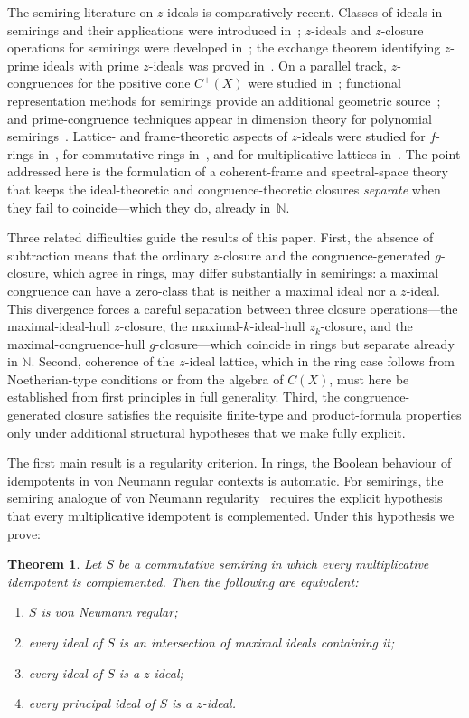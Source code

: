 \documentclass[11pt,leqno]{amsart}
\theoremstyle{plain}
\newtheorem{maintheorem}{Theorem}
\theoremstyle{definition}
\theoremstyle{remark}
\numberwithin{equation}{section}
\newcommand{\N}{\mathds N}
\begin{document}
The semiring literature on $z$-ideals is comparatively recent.
Classes of ideals in semirings and their applications were introduced
in~\cite{BiswasFilomat}; $z$-ideals and $z$-closure operations
for semirings were developed in~\cite{AG23}; the exchange theorem
identifying $z$-prime ideals with prime $z$-ideals was
proved in~\cite{AG25}.
On a parallel track, $z$-congruences for the positive cone $C^+(X)$
were studied in~\cite{BiswasPositivity};
functional representation methods for semirings provide an additional
geometric source~\cite{Chermnykh12};
and prime-congruence techniques appear in dimension theory for
polynomial semirings~\cite{Joo/Micheva/dimension}.
Lattice- and frame-theoretic aspects of $z$-ideals were studied
for $f$-rings in~\cite{DubeZ-ideals,DubeRadical},
for commutative rings in~\cite{Ighedo},
and for multiplicative lattices in~\cite{GoswamiDube}.
The point addressed here is the formulation of a coherent-frame
and spectral-space theory that keeps the ideal-theoretic and
congruence-theoretic closures \emph{separate} when they fail to coincide---which they do, already in~$\N$.

Three related difficulties guide the results of this paper.
First, the absence of subtraction means that the ordinary $z$-closure
and the congruence-generated $g$-closure, which agree in rings,
may differ substantially in semirings:
a maximal congruence can have a zero-class that is neither a maximal
ideal nor a $z$-ideal.
This divergence forces a careful separation between three closure
operations---the maximal-ideal-hull $z$-closure,
the maximal-$k$-ideal-hull $z_k$-closure,
and the maximal-congruence-hull $g$-closure---which coincide in
rings but separate already in $\N$.
Second, coherence of the $z$-ideal lattice, which in the ring case
follows from Noetherian-type conditions or from the algebra of
$C(X)$, must here be established from first principles in full
generality.
Third, the congruence-generated closure satisfies the requisite
finite-type and product-formula properties only under additional
structural hypotheses that we make fully explicit.

The first main result is a regularity criterion.
In rings, the Boolean behaviour of idempotents in von Neumann regular
contexts is automatic.
For semirings, the semiring analogue of von Neumann
regularity~\cite{Subramanian70/RegularSemirings} requires the explicit
hypothesis that every multiplicative idempotent is complemented.
Under this hypothesis we prove:

\begin{maintheorem}\label{main:regularity}
Let $S$ be a commutative semiring in which every multiplicative
idempotent is complemented.  Then the following are equivalent:
\begin{enumerate}[label=\upshape(\roman*)]
\item $S$ is von Neumann regular;
\item every ideal of $S$ is an intersection of maximal ideals
  containing it;
\item every ideal of $S$ is a $z$-ideal;
\item every principal ideal of $S$ is a $z$-ideal.
\end{enumerate}
\end{maintheorem}
\end{document}
